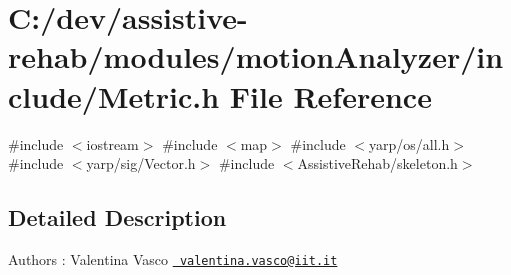 \section{C\+:/dev/assistive-\/rehab/modules/motion\+Analyzer/include/\+Metric.h File Reference}
\label{Metric_8h}
{\ttfamily \#include $<$iostream$>$}\newline
{\ttfamily \#include $<$map$>$}\newline
{\ttfamily \#include $<$yarp/os/all.\+h$>$}\newline
{\ttfamily \#include $<$yarp/sig/\+Vector.\+h$>$}\newline
{\ttfamily \#include $<$Assistive\+Rehab/skeleton.\+h$>$}\newline


\subsection{Detailed Description}
\begin{DoxyAuthor}{Authors}
\+: Valentina Vasco \href{mailto:valentina.vasco@iit.it}{\texttt{ valentina.\+vasco@iit.\+it}} 
\end{DoxyAuthor}
